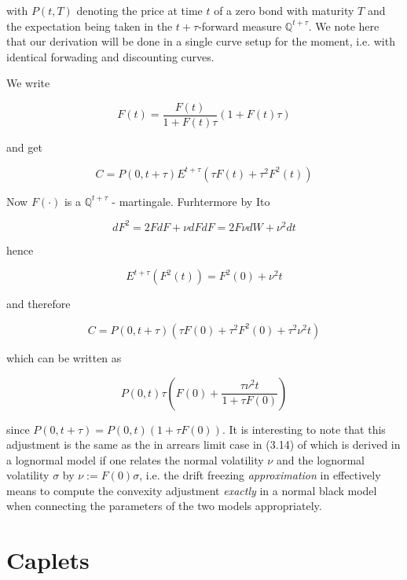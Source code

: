\documentclass{amsart}
\theoremstyle{plain}
\numberwithin{equation}{section}
\begin{document}
with $P(t,T)$ denoting the price at time $t$ of a zero bond with maturity $T$ and the expectation being taken in the $t+\tau$-forward measure $\mathbb{Q}^{t+\tau}$.  We note here that our derivation will be done in a single curve setup for the moment, i.e. with identical forwading and discounting curves.

We write

\begin{equation}
F(t) = \frac{F(t)}{1+F(t)\tau} (1+F(t)\tau)
\end{equation}

and get

\begin{equation}
C = P(0,t+\tau) E^{t+\tau}(\tau F(t) + \tau^2 F^2(t))
\end{equation}

Now $F(\cdot)$ is a $\mathbb{Q}^{t+\tau}$ - martingale. Furhtermore by Ito

\begin{equation}
dF^2 = 2 F dF + \nu dF dF = 2F\nu dW + \nu^2 dt
\end{equation}

hence 

\begin{equation}
E^{t+\tau}(F^2(t)) = F^2(0) + \nu^2 t
\end{equation}

and therefore

\begin{equation}
C = P(0,t+\tau) (\tau F(0) + \tau^2 F^2(0) + \tau^2 \nu^2 t )
\end{equation}

which can be written as 

\begin{equation}
P(0,t) \tau \left( F(0) + \frac{\tau \nu^2 t}{1+\tau F(0)}\right)
\end{equation}

since $P(0,t+\tau) = P(0,t) (1+\tau F(0))$. It is interesting to note that this adjustment is the same as the in arrears limit case in (3.14) of \cite{LiborTimingAdjustments} which is derived in a lognormal model if one relates the normal volatility $\nu$ and the lognormal volatility $\sigma$ by $\nu := F(0) \sigma$, i.e. the drift freezing \textit{approximation} in \cite{LiborTimingAdjustments} effectively means to compute the convexity adjustment \textit{exactly} in a normal black model when connecting the parameters of the two models appropriately.

\section{Caplets}
\end{document}
